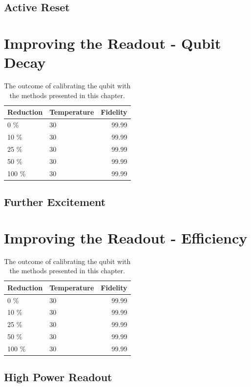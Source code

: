 \subsection{Active Reset}

\section{Improving the Readout - Qubit Decay}


\begin{table}[h]
\centering
\caption{The outcome of calibrating the qubit with the methods presented in this chapter.}
\begin{tabular}{ll|r}
\hline
\textbf{Reduction}        & Temperature                  & Fidelity\\ \hline
0   \%                      &  30                        &  99.99\\
10  \%                     &  30                         &  99.99\\
25  \%                     &  30                         &  99.99\\
50  \%                     &  30                         &  99.99\\
100 \%                     &  30                         &  99.99\\
\end{tabular}
\label{tab:readout_infidelity_contribution_estimation}
\end{table}



\subsection{Further Excitement}

\section{Improving the Readout - Efficiency}


\begin{table}[h]
\centering
\caption{The outcome of calibrating the qubit with the methods presented in this chapter.}
\begin{tabular}{ll|r}
\hline
\textbf{Reduction}        & Temperature                  & Fidelity\\ \hline
0   \%                      &  30                        &  99.99\\
10  \%                     &  30                         &  99.99\\
25  \%                     &  30                         &  99.99\\
50  \%                     &  30                         &  99.99\\
100 \%                     &  30                         &  99.99\\
\end{tabular}
\label{tab:readout_infidelity_contribution_estimation}
\end{table}



\subsection{High Power Readout}


